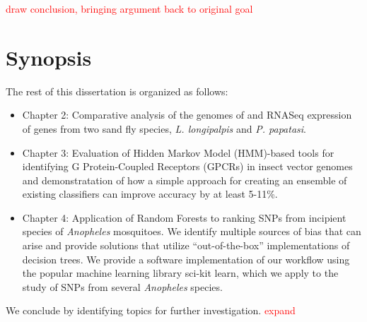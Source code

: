 \textcolor{red}{draw conclusion, bringing argument back to original goal}

\section{Synopsis}
The rest of this dissertation is organized as follows:

\begin{itemize}
\item Chapter 2: Comparative analysis of the genomes of and RNASeq expression of genes from two sand fly species, \emph{L. longipalpis} and \emph{P. papatasi}.
\item Chapter 3: Evaluation of Hidden Markov Model (HMM)-based tools for identifying G Protein-Coupled Receptors (GPCRs) in insect vector genomes and demonstratation of how a simple approach for creating an ensemble of existing classifiers can improve accuracy by at least 5-11\%.
\item Chapter 4: Application of Random Forests to ranking SNPs from incipient species of \emph{Anopheles} mosquitoes.  We identify multiple sources of bias that can arise and provide solutions that utilize ``out-of-the-box'' implementations of decision trees.  We provide a software implementation of our workflow using the popular machine learning library sci-kit learn, which we apply to the study of SNPs from several \emph{Anopheles} species.
\end{itemize}

We conclude by identifying topics for further investigation. \textcolor{red}{expand}
